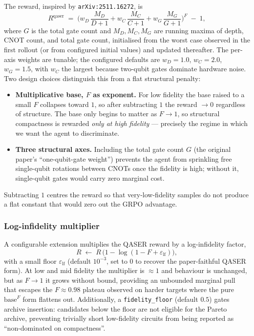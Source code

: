 \documentclass[11pt,a4paper]{article}
\begin{document}
The reward, inspired by \texttt{arXiv:2511.16272}, is
\begin{equation}
R^{\text{qaser}}
\;=\;
\Biggl(
w_D\,\frac{M_D}{D + 1} +
w_C\,\frac{M_C}{C + 1} +
w_G\,\frac{M_G}{G + 1}
\Biggr)^{F}
\;-\; 1,
\label{eq:reward-qaser}
\end{equation}
where $G$ is the total gate count and $M_D, M_C, M_G$ are running maxima of depth, CNOT count, and total gate count, initialised from the worst case observed in the first rollout (or from configured initial values) and updated thereafter. The per-axis weights are tunable; the configured defaults are $w_D = 1.0$, $w_C = 2.0$, $w_G = 1.5$, with $w_C$ the largest because two-qubit gates dominate hardware noise. Two design choices distinguish this from a flat structural penalty:
\begin{itemize}[leftmargin=2em]
  \item \textbf{Multiplicative base, $F$ as exponent.} For low fidelity the base raised to a small $F$ collapses toward $1$, so after subtracting $1$ the reward $\to 0$ regardless of structure. The base only begins to matter as $F \to 1$, so structural compactness is rewarded \emph{only at high fidelity} --- precisely the regime in which we want the agent to discriminate.
  \item \textbf{Three structural axes.} Including the total gate count $G$ (the original paper's ``one-qubit-gate weight'') prevents the agent from sprinkling free single-qubit rotations between CNOTs once the fidelity is high; without it, single-qubit gates would carry zero marginal cost.
\end{itemize}
Subtracting $1$ centres the reward so that very-low-fidelity samples do not produce a flat constant that would zero out the GRPO advantage.

\subsubsection{Log-infidelity multiplier}

A configurable extension multiplies the QASER reward by a log-infidelity factor,
\begin{equation}
R \;\leftarrow\; R\,\bigl(1 - \log(1 - F + \varepsilon_{\text{lf}})\bigr),
\label{eq:reward-loginf}
\end{equation}
with a small floor $\varepsilon_{\text{lf}}$ (default $10^{-3}$, set to $0$ to recover the paper-faithful QASER form). At low and mid fidelity the multiplier is $\approx 1$ and behaviour is unchanged, but as $F \to 1$ it grows without bound, providing an unbounded marginal pull that escapes the $F \approx 0.98$ plateau observed on harder targets where the pure $\text{base}^F$ form flattens out. Additionally, a \texttt{fidelity\_floor} (default $0.5$) gates archive insertion: candidates below the floor are not eligible for the Pareto archive, preventing trivially short low-fidelity circuits from being reported as ``non-dominated on compactness''.
\end{document}
